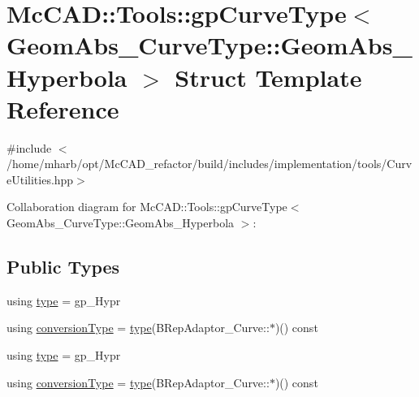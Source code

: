 \hypertarget{structMcCAD_1_1Tools_1_1gpCurveType_3_01GeomAbs__CurveType_1_1GeomAbs__Hyperbola_01_4}{}\section{Mc\+C\+AD\+:\+:Tools\+:\+:gp\+Curve\+Type$<$ Geom\+Abs\+\_\+\+Curve\+Type\+:\+:Geom\+Abs\+\_\+\+Hyperbola $>$ Struct Template Reference}
\label{structMcCAD_1_1Tools_1_1gpCurveType_3_01GeomAbs__CurveType_1_1GeomAbs__Hyperbola_01_4}


{\ttfamily \#include $<$/home/mharb/opt/\+Mc\+C\+A\+D\+\_\+refactor/build/includes/implementation/tools/\+Curve\+Utilities.\+hpp$>$}



Collaboration diagram for Mc\+C\+AD\+:\+:Tools\+:\+:gp\+Curve\+Type$<$ Geom\+Abs\+\_\+\+Curve\+Type\+:\+:Geom\+Abs\+\_\+\+Hyperbola $>$\+:
\subsection*{Public Types}
\begin{DoxyCompactItemize}
\item 
using \hyperlink{structMcCAD_1_1Tools_1_1gpCurveType_3_01GeomAbs__CurveType_1_1GeomAbs__Hyperbola_01_4_aca7ee4ad0c710243b8a164ee15f28ccd}{type} = gp\+\_\+\+Hypr
\item 
using \hyperlink{structMcCAD_1_1Tools_1_1gpCurveType_3_01GeomAbs__CurveType_1_1GeomAbs__Hyperbola_01_4_a0b812f11998e2a5801e6a5b91e1b303c}{conversion\+Type} = \hyperlink{structMcCAD_1_1Tools_1_1gpCurveType_3_01GeomAbs__CurveType_1_1GeomAbs__Hyperbola_01_4_aca7ee4ad0c710243b8a164ee15f28ccd}{type}(B\+Rep\+Adaptor\+\_\+\+Curve\+::$\ast$)() const
\item 
using \hyperlink{structMcCAD_1_1Tools_1_1gpCurveType_3_01GeomAbs__CurveType_1_1GeomAbs__Hyperbola_01_4_aca7ee4ad0c710243b8a164ee15f28ccd}{type} = gp\+\_\+\+Hypr
\item 
using \hyperlink{structMcCAD_1_1Tools_1_1gpCurveType_3_01GeomAbs__CurveType_1_1GeomAbs__Hyperbola_01_4_a0b812f11998e2a5801e6a5b91e1b303c}{conversion\+Type} = \hyperlink{structMcCAD_1_1Tools_1_1gpCurveType_3_01GeomAbs__CurveType_1_1GeomAbs__Hyperbola_01_4_aca7ee4ad0c710243b8a164ee15f28ccd}{type}(B\+Rep\+Adaptor\+\_\+\+Curve\+::$\ast$)() const
\end{DoxyCompactItemize}
